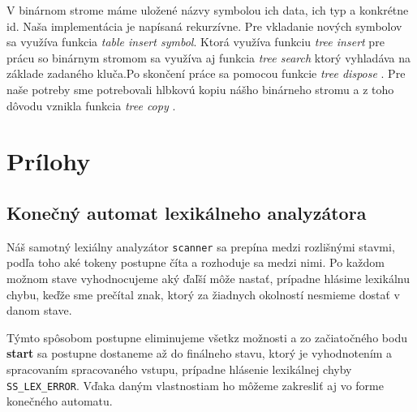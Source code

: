 \documentclass[12pt, a4paper]{article}
\begin{document}
				V binárnom strome máme uložené názvy symbolou ich data, ich typ a konkrétne id. Naša implementácia je napísaná rekurzívne. Pre vkladanie nových symbolov sa využíva funkcia \textit{table insert symbol}. Ktorá využíva funkciu \textit{tree insert} pre prácu so binárnym stromom sa využíva aj funkcia \textit{tree search} ktorý vyhladáva na základe zadaného kluča.Po skončení práce sa pomocou funkcie \textit{tree dispose} . Pre naše potreby sme potrebovali hlbkovú kopiu nášho binárneho stromu a z toho dôvodu vznikla funkcia \textit{tree copy} .
    \newpage
	\section{Prílohy}
        \subsection{Konečný automat lexikálneho analyzátora} \label{sec:KA}
        Náš samotný lexiálny analyzátor \texttt{scanner} sa prepína medzi rozlišnými stavmi, podľa toho aké tokeny postupne číta a rozhoduje sa medzi nimi. Po každom možnom stave vyhodnocujeme aký ďaľší môže nastať, prípadne hlásime lexikálnu chybu, keďže sme prečítal znak, ktorý za žiadnych okolností nesmieme dostať v danom stave. 
        
        Týmto spôsobom postupne eliminujeme všetkz možnosti a zo začiatočného bodu \textbf{start} sa postupne dostaneme až do finálneho stavu, ktorý je vyhodnotením a spracovaním spracovaného vstupu, prípadne hlásenie lexikálnej chyby \verb|SS_LEX_ERROR|. Vďaka daným vlastnostiam ho môžeme zakresliť aj vo forme konečného automatu.
        
\end{document}
